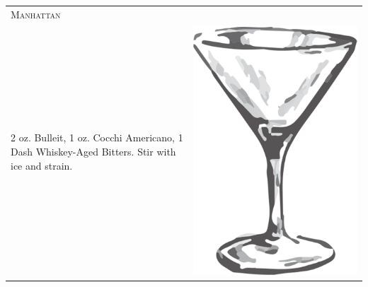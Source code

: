\documentclass{article}
\begin{document}
\begin{tabular}{p{2in} p{0.5in}}
\multicolumn{2}{p{3in}}{\centering\Huge\textsc{Manhattan}} \\ 
   \vspace{-0.1in}2 oz. Bulleit, 1 oz. Cocchi Americano, 1 Dash Whiskey-Aged Bitters. Stir with ice and strain. &
   \vspace{-0.1in} \includegraphics{goblet.png}
\end{tabular}
\end{document}
